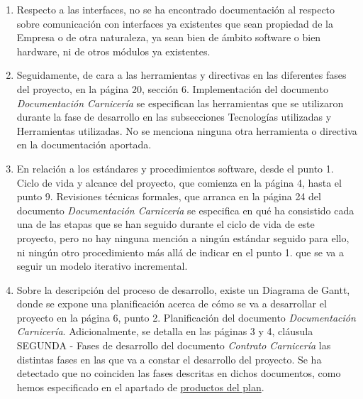 \documentclass[a4paper,12pt]{report}
\begin{document}
\begin{enumerate}
\begin{enumerate}
            \item Respecto a las interfaces, no se ha encontrado documentación al respecto
            sobre comunicación con interfaces ya existentes que sean propiedad de la Empresa
            o de otra naturaleza, ya sean bien de ámbito software o bien hardware, ni de
            otros módulos ya existentes.\label{interfaces}
            
            \item Seguidamente, de cara a las herramientas y directivas en las diferentes
            fases del proyecto, en la página 20, sección 6. Implementación del documento \textit{Documentación Carnicería} se especifican las herramientas que se 
            utilizaron  durante la fase de desarrollo en las subsecciones Tecnologías 
            utilizadas y Herramientas utilizadas. No se menciona ninguna otra herramienta
            o directiva en la documentación aportada.\label{herramientas}
            
            \item En relación a los estándares y procedimientos software, desde el punto 1. 
            Ciclo de vida y alcance del proyecto, que comienza en la página 4, hasta el 
            punto 9. Revisiones técnicas formales, que arranca en la página 24 del documento
            \textit{Documentación Carnicería} se especifica en qué ha consistido cada una
            de las etapas que se han seguido durante el ciclo de vida de este proyecto,
            pero no hay ninguna mención a ningún estándar seguido para ello, ni ningún otro procedimiento más allá de indicar en el punto 1. que se va a seguir un modelo
            iterativo incremental.\label{estandares}
            
            \item Sobre la descripción del proceso de desarrollo, existe un Diagrama de Gantt,
            donde se expone una planificación acerca de cómo se va a desarrollar el proyecto en
            la página 6, punto 2. Planificación del documento \textit{Documentación Carnicería}. Adicionalmente, se detalla en las páginas 3 y 4, cláusula SEGUNDA - Fases de
            desarrollo del documento \textit{Contrato Carnicería} las distintas fases en 
            las que va a constar el desarrollo del proyecto. Se ha detectado que
            no coinciden las fases descritas en dichos documentos, como hemos especificado en
            el apartado de \hyperref[productos]{productos del plan}.\label{descripcion}
            

\end{enumerate}
\end{enumerate}
\end{document}

